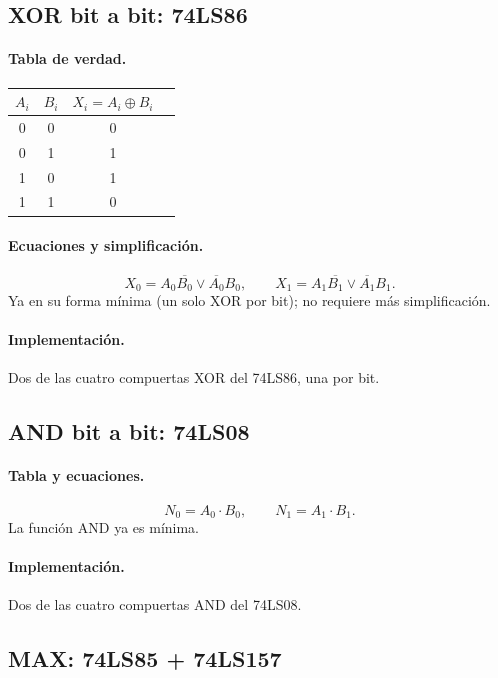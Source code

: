 \documentclass[a4paper,12pt]{article}
\begin{document}
\subsection{XOR bit a bit: 74LS86}
\paragraph{Tabla de verdad.}
\begin{table}[H]
\centering
\begin{tabular}{cc|cc}
\toprule
$A_i$ & $B_i$ & $X_i = A_i \oplus B_i$ \\
\midrule
0 & 0 & 0 \\
0 & 1 & 1 \\
1 & 0 & 1 \\
1 & 1 & 0 \\
\bottomrule
\end{tabular}
\end{table}

\paragraph{Ecuaciones y simplificaci\'{o}n.}
$$X_0 = A_0\overline{B_0} \lor \overline{A_0}B_0, \qquad
  X_1 = A_1\overline{B_1} \lor \overline{A_1}B_1.$$
Ya en su forma m\'{i}nima (un solo XOR por bit); no requiere m\'{a}s
simplificaci\'{o}n.

\paragraph{Implementaci\'{o}n.} Dos de las cuatro compuertas XOR del
74LS86, una por bit.

\subsection{AND bit a bit: 74LS08}
\paragraph{Tabla y ecuaciones.}
$$N_0 = A_0 \cdot B_0, \qquad N_1 = A_1 \cdot B_1.$$
La funci\'{o}n AND ya es m\'{i}nima.

\paragraph{Implementaci\'{o}n.} Dos de las cuatro compuertas AND del
74LS08.

\subsection{MAX: 74LS85 + 74LS157}
\end{document}
